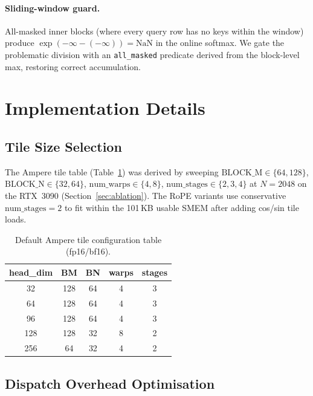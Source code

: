 \documentclass[10pt,twocolumn]{article}
\begin{document}
\paragraph{Sliding-window guard.}
All-masked inner blocks (where every query row has no keys within the
window) produce $\exp(-\infty - (-\infty)) = \text{NaN}$ in the online
softmax.  We gate the problematic division with an \texttt{all\_masked}
predicate derived from the block-level max, restoring correct accumulation.

\section{Implementation Details}

\subsection{Tile Size Selection}

The Ampere tile table (Table~\ref{tab:tile}) was derived by sweeping
$\text{BLOCK\_M} \in \{64,128\}$, $\text{BLOCK\_N} \in \{32,64\}$,
$\text{num\_warps} \in \{4,8\}$, $\text{num\_stages} \in \{2,3,4\}$
at $N{=}2048$ on the RTX~3090 (Section~\ref{sec:ablation}).
The RoPE variants use conservative $\text{num\_stages}=2$ to fit within
the 101\,KB usable SMEM after adding cos/sin tile loads.

\begin{table}[H]
\centering
\caption{Default Ampere tile configuration table (fp16/bf16).}
\label{tab:tile}
\small
\begin{tabular}{ccccc}
\toprule
\textbf{head\_dim} & \textbf{BM} & \textbf{BN} & \textbf{warps} & \textbf{stages} \\
\midrule
32  & 128 & 64 & 4 & 3 \\
64  & 128 & 64 & 4 & 3 \\
96  & 128 & 64 & 4 & 3 \\
128 & 128 & 32 & 8 & 2 \\
256 & 64  & 32 & 4 & 2 \\
\bottomrule
\end{tabular}
\end{table}

\subsection{Dispatch Overhead Optimisation}
\end{document}
